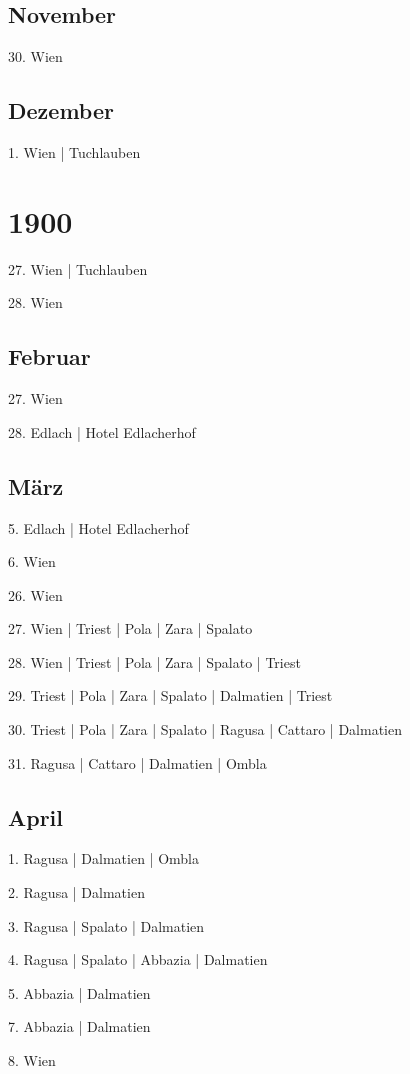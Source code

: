 \documentclass[twoside=false,titlepage=false,open=any, parskip=never, fontsize=10pt, headings=small, chapterprefix=false, appendixprefix=false, DIV=15]{scrbook}
\begin{document}
\begin{multicols}{3}
            \section*{November}
            30. Wien\par
            \section*{Dezember}
            1. Wien | Tuchlauben\par
            \chapter*{1900}
            27. Wien | Tuchlauben\par
            28. Wien\par
            \section*{Februar}
            27. Wien\par
            28. Edlach | Hotel Edlacherhof\par
            \section*{März}
            5. Edlach | Hotel Edlacherhof\par
            6. Wien\par
            26. Wien\par
            27. Wien | Triest | Pola | Zara | Spalato\par
            28. Wien | Triest | Pola | Zara | Spalato | Triest\par
            29. Triest | Pola | Zara | Spalato | Dalmatien | Triest\par
            30. Triest | Pola | Zara | Spalato | Ragusa | Cattaro | Dalmatien\par
            31. Ragusa | Cattaro | Dalmatien | Ombla\par
            \section*{April}
            1. Ragusa | Dalmatien | Ombla\par
            2. Ragusa | Dalmatien\par
            3. Ragusa | Spalato | Dalmatien\par
            4. Ragusa | Spalato | Abbazia | Dalmatien\par
            5. Abbazia | Dalmatien\par
            7. Abbazia | Dalmatien\par
            8. Wien\par

\end{multicols}
\end{document}
